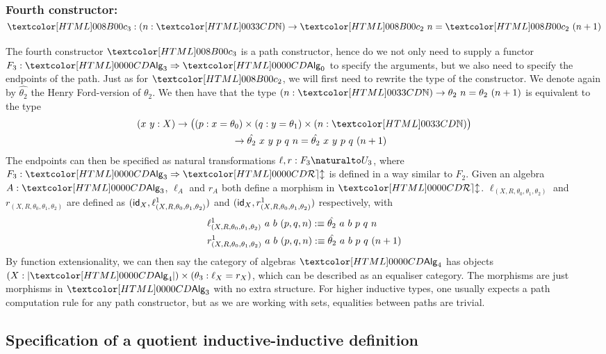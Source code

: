 \subsubsection{Fourth constructor: $\Bciii : (n : \natty) \to \Bcii\ n = \Bcii\ (n+1)$}

The fourth constructor $\Bciii$ is a path constructor, hence do we not
only need to supply a functor $F_3 : \Func{\Alg_3}{\Alg_0}$ to specify
the arguments, but we also need to specify the endpoints of the
path. Just as for $\Bcii$, we will first need to rewrite the type of
the constructor. We denote again by $\hat{\theta_2}$ the Henry
Ford-version of $\theta_2$.  We then have that the type
$(n : \natty) \to \theta_2\ n = \theta_2\ (n+ 1)$ is equivalent to the
type
%
\begin{multline*}
(x\ y : X) \to \big((p : x =  \theta_0) \times (q : y = \theta_1) \times (n : \natty)\big) \\
\ \ \ \ \to \hat{\theta_2}\ x\ y\ p\ q\ n = \hat{\theta_2}\ x\ y\ p\ q\ (n+1)
\end{multline*}
%
The endpoints can then be specified as natural transformations
$\ell, r : \Nat{F_3}{U_3}$, where $F_3 : \Func{\Alg_3}{\REL}$ is defined in a
way similar to $F_2$. Given an algebra $A : \Alg_3$, $\ell_A$ and $r_A$
both define a morphism in
$\REL$. $\ell_{(X,R,\theta_0,\theta_1,\theta_2)}$ and
$r_{(X,R,\theta_0,\theta_1,\theta_2)}$ are defined as
$(\id_X, \ell^1_{(X,R,\theta_0,\theta_1,\theta_2)})$ and
$(\id_X,r^1_{(X,R,\theta_0,\theta_1,\theta_2)})$ respectively, with
%
\begin{align*}
&\ell^1_{(X,R,\theta_0,\theta_1,\theta_2)}\ a\ b\ (p, q, n) :\equiv \hat{\theta_2}\ a\ b\ p\ q\ n \\
&r^1_{(X,R,\theta_0,\theta_1,\theta_2)}\ a\ b\ (p, q, n) :\equiv \hat{\theta_2}\ a\ b\ p\ q\ (n+1)
\end{align*}
%
By function extensionality, we can then say the category of algebras
$\Alg_4$ has objects
$(X : | \Alg_4 |) \times (\theta_3 : \ell_X = r_X)$, which can be
described as an equaliser category. The morphisms are just morphisms
in $\Alg_3$ with no extra structure. For higher inductive types, one
usually expects a path computation rule for any path constructor, but
as we are working with sets, equalities between paths are trivial.

\subsection{Specification of a quotient inductive-inductive definition}

